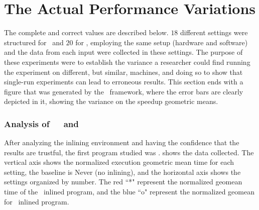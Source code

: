 \section{The Actual Performance Variations}

The complete and correct values are described below. $18$ different settings were structured for \bzip\ and $20$ for \gzip, employing the same setup (hardware and software) and the data from each input were collected in these settings. The purpose of these experiments were to establish the variance a researcher could find running the experiment on different, but similar, machines, and doing so to show that single-run experiments can lead to erroneous results. This section ends with a figure that was generated by the \CP\ framework, where the error bars are clearly depicted in it, showing the variance on the speedup geometric means.

\subsubsection{Analysis of\ \ \bzip\  and  \gzip}

After analyzing the inlining environment and having the confidence that the results are trustful, the first program studied was \bzip. 
 shows the data collected. The vertical axis shows the normalized execution geometric mean time for each setting, the baseline is Never (no inlining), and the horizontal axis shows the settings organized by number. The red ``*" represent the normalized geomean time of the \FDI\ inlined program, and the blue ``o" represent the normalized geomean for \llvm\ inlined program.

